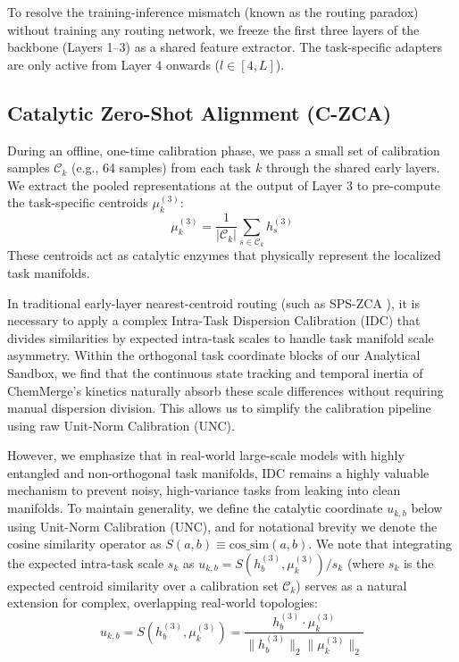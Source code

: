 To resolve the training-inference mismatch (known as the routing paradox) without training any routing network, we freeze the first three layers of the backbone (Layers 1--3) as a shared feature extractor. The task-specific adapters are only active from Layer 4 onwards ($l \in [4, L]$).

\subsection{Catalytic Zero-Shot Alignment (C-ZCA)}
During an offline, one-time calibration phase, we pass a small set of calibration samples $\mathcal{C}_k$ (e.g., 64 samples) from each task $k$ through the shared early layers. We extract the pooled representations at the output of Layer 3 to pre-compute the task-specific centroids $\mu_k^{(3)}$:
\begin{equation}
\mu_k^{(3)} = \frac{1}{|\mathcal{C}_k|} \sum_{s \in \mathcal{C}_k} h_s^{(3)}
\end{equation}
These centroids act as catalytic enzymes that physically represent the localized task manifolds. 

In traditional early-layer nearest-centroid routing (such as SPS-ZCA \cite{zhang24spszca}), it is necessary to apply a complex Intra-Task Dispersion Calibration (IDC) that divides similarities by expected intra-task scales to handle task manifold scale asymmetry. Within the orthogonal task coordinate blocks of our Analytical Sandbox, we find that the continuous state tracking and temporal inertia of ChemMerge's kinetics naturally absorb these scale differences without requiring manual dispersion division. This allows us to simplify the calibration pipeline using raw Unit-Norm Calibration (UNC). 

However, we emphasize that in real-world large-scale models with highly entangled and non-orthogonal task manifolds, IDC remains a highly valuable mechanism to prevent noisy, high-variance tasks from leaking into clean manifolds. To maintain generality, we define the catalytic coordinate $u_{k, b}$ below using Unit-Norm Calibration (UNC), and for notational brevity we denote the cosine similarity operator as $S(a, b) \equiv \text{cos\_sim}(a, b)$. We note that integrating the expected intra-task scale $s_k$ as $u_{k,b} = S(h_b^{(3)}, \mu_k^{(3)}) / s_k$ (where $s_k$ is the expected centroid similarity over a calibration set $\mathcal{C}_k$) serves as a natural extension for complex, overlapping real-world topologies:
\begin{equation}
u_{k, b} = S(h_b^{(3)}, \mu_k^{(3)}) = \frac{h_b^{(3)} \cdot \mu_k^{(3)}}{\|h_b^{(3)}\|_2 \|\mu_k^{(3)}\|_2}
\label{eq:calibrated_coordinate}
\end{equation}

